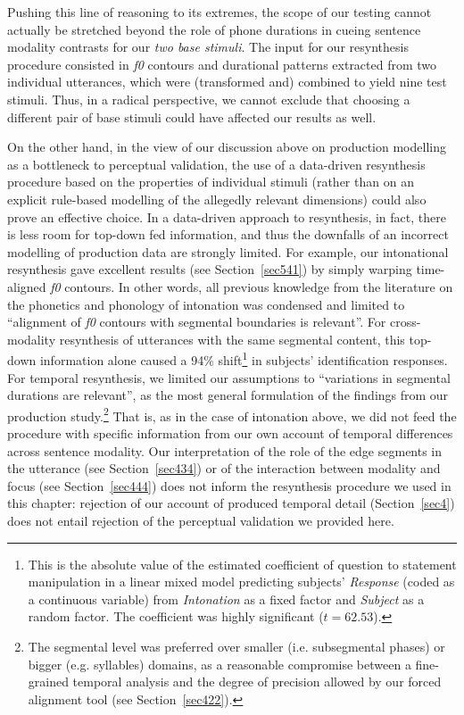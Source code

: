 Pushing this line of reasoning to its extremes, the scope of our testing cannot actually be stretched beyond the role of phone durations in cueing sentence modality contrasts for our \textit{two base stimuli}. The input for our resynthesis procedure consisted in \textit{f0} contours and durational patterns extracted from two individual utterances, which were (transformed and) combined to yield  nine test stimuli. Thus, in a radical perspective, we cannot exclude that choosing a different pair of base stimuli could have affected our results as well.

On the other hand, in the view of our discussion above on production modelling as a bottleneck to perceptual validation, the use of a data-driven resynthesis procedure based on the properties of individual stimuli (rather than on an explicit rule-based modelling of the allegedly relevant dimensions) could also prove an effective choice. In a data-driven approach to resynthesis, in fact, there is less room for top-down fed information, and thus the downfalls of an incorrect modelling of production data are strongly limited. For example, our intonational resynthesis gave excellent results (see Section~\ref{sec541}) by simply warping time-aligned \textit{f0} contours. In other words, all previous knowledge from the literature on the phonetics and phonology of intonation was condensed and limited to ``alignment of \textit{f0} contours with segmental boundaries is relevant''. For cross-modality resynthesis of utterances with the same segmental content, this top-down information alone caused a 94\% shift\footnote{This is the absolute value of the estimated coefficient of question to statement manipulation in a linear mixed model predicting subjects' \textit{Response} (coded as a continuous variable) from \textit{Intonation} as a fixed factor and \textit{Subject} as a random factor. The coefficient was highly significant ($t=62.53$).} in subjects' identification responses. For temporal resynthesis, we limited our assumptions to ``variations in segmental durations are relevant'', as the most general formulation of the findings from our production study.\footnote{The segmental level was preferred over smaller (i.e. subsegmental phases) or bigger (e.g. syllables) domains, as a reasonable compromise between a fine-grained temporal analysis and the degree of precision allowed by our forced alignment tool (see Section~\ref{sec422}).} That is, as in the case of intonation above, we did not feed the procedure with specific information from our own account of temporal differences across sentence modality. Our interpretation of the role of the edge segments in the utterance (see Section~\ref{sec434}) or of the interaction between modality and focus (see Section~\ref{sec444}) does not inform the resynthesis procedure we used in this chapter: rejection of our account of produced temporal detail (Section~\ref{sec4}) does not entail rejection of the perceptual validation we provided here.


